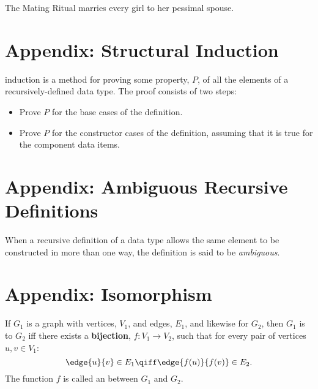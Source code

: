 \documentclass[quiz]{mcs}
\begin{document}
The Mating Ritual marries every girl to her pessimal spouse.

\section*{Appendix: Structural Induction}

 induction is a method for proving
some property, $P$, of all the elements of a recursively-defined data
type.  The proof consists of two steps:
\begin{itemize}
\item Prove $P$ for the base cases of the definition. 
\item Prove $P$ for the constructor cases of the definition, assuming that it
  is true for the component data items.  
\end{itemize}

\section*{Appendix: Ambiguous Recursive Definitions}

When a recursive definition of a data type
allows the same element to be constructed in more than one way, the
definition is said to be \emph{ambiguous}.

\section*{Appendix: Isomorphism}

  If $G_1$ is a graph with vertices, $V_1$, and edges, $E_1$, and likewise
  for $G_2$, then $G_1$ is  to $G_2$ iff there exists a
  \textbf{bijection}, $f: V_1 \to V_2$, such that for every pair of
  vertices $u, v \in V_1$:
\[
\edge{u}{v} \in E_1 \qiff \edge{f(u)}{f(v)} \in E_2.
\]
The function $f$ is called an  between $G_1$ and
$G_2$.
\end{document}
